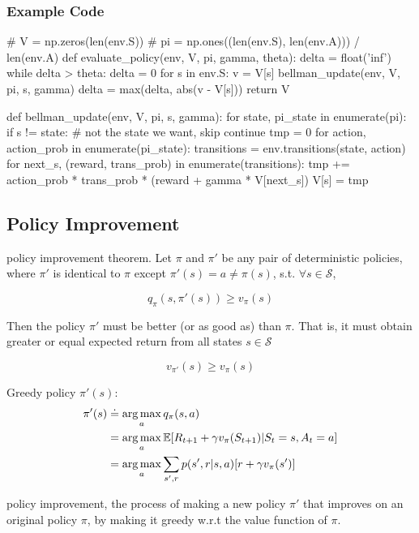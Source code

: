 \documentclass[sutton_barto_notes.tex]{subfiles}
\begin{document}
\subsubsection{Example Code}
\begin{python}
# V = np.zeros(len(env.S))
# pi = np.ones((len(env.S), len(env.A))) / len(env.A)
def evaluate_policy(env, V, pi, gamma, theta):
    delta = float('inf')
    while delta > theta:
        delta = 0
        for s in env.S:
            v = V[s]
            bellman_update(env, V, pi, s, gamma)
            delta = max(delta, abs(v - V[s]))
    return V

def bellman_update(env, V, pi, s, gamma):
    for state, pi_state in enumerate(pi):
        if s != state:  # not the state we want, skip
            continue
        tmp = 0
        for action, action_prob in enumerate(pi_state):
            transitions = env.transitions(state, action)
            for next_s, (reward, trans_prob) in enumerate(transitions):
                tmp += action_prob * trans_prob * (reward + gamma * V[next_s])
        V[s] = tmp
\end{python}

\subsection{Policy Improvement}

\begin{definition}
policy improvement theorem. Let $\pi$ and $\pi'$ be any pair of deterministic policies, where $\pi'$ is identical to $\pi$ except $\pi'(s) = a \neq \pi(s)$, s.t. $\forall s \in \mathcal{S}$,

$$ q_\pi (s,\pi'(s)) \geq v_\pi(s) $$

Then the policy $\pi'$ must be better (or as good as) than $\pi$. That is, it must obtain greater or equal expected return from all states $s \in \mathcal{S}$

$$ v_{\pi'}(s) \geq v_\pi (s) $$
\end{definition}

Greedy policy $\pi'(s)$:
\begin{align*}
\pi'(s) &\doteq \operatorname*{arg\,max}_a q_\pi (s,a) \\
&= \operatorname*{arg\,max}_a \operatorname*{\mathbb{E}} [ R_{t+1} + \gamma v_\pi (S_{t+1}) | S_t = s, A_t = a] \\
&= \operatorname*{arg\,max}_a \sum_{s',r} p(s',r|s,a)[r+\gamma v_\pi(s')]
\end{align*}

\begin{definition}
policy improvement, the process of making a new policy $\pi'$ that improves on an original policy $\pi$, by making it greedy w.r.t the value function of $\pi$.
\end{definition}
 
\end{document}
